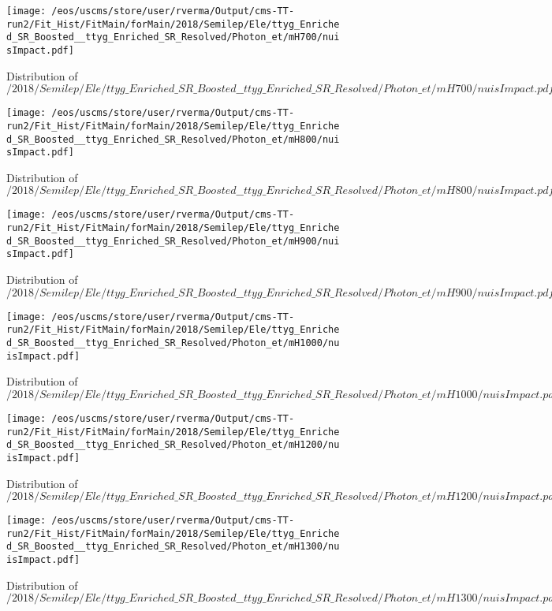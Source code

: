 \begin{figure}
\centering
\texttt{[image: /eos/uscms/store/user/rverma/Output/cms-TT-run2/Fit\_Hist/FitMain/forMain/2018/Semilep/Ele/ttyg\_Enriched\_SR\_Boosted\_\_ttyg\_Enriched\_SR\_Resolved/Photon\_et/mH700/nuisImpact.pdf]}
\caption{Distribution of $/2018/Semilep/Ele/ttyg\_Enriched\_SR\_Boosted\_\_ttyg\_Enriched\_SR\_Resolved/Photon\_et/mH700/nuisImpact.pdf$}
\end{figure}

\begin{figure}
\centering
\texttt{[image: /eos/uscms/store/user/rverma/Output/cms-TT-run2/Fit\_Hist/FitMain/forMain/2018/Semilep/Ele/ttyg\_Enriched\_SR\_Boosted\_\_ttyg\_Enriched\_SR\_Resolved/Photon\_et/mH800/nuisImpact.pdf]}
\caption{Distribution of $/2018/Semilep/Ele/ttyg\_Enriched\_SR\_Boosted\_\_ttyg\_Enriched\_SR\_Resolved/Photon\_et/mH800/nuisImpact.pdf$}
\end{figure}

\begin{figure}
\centering
\texttt{[image: /eos/uscms/store/user/rverma/Output/cms-TT-run2/Fit\_Hist/FitMain/forMain/2018/Semilep/Ele/ttyg\_Enriched\_SR\_Boosted\_\_ttyg\_Enriched\_SR\_Resolved/Photon\_et/mH900/nuisImpact.pdf]}
\caption{Distribution of $/2018/Semilep/Ele/ttyg\_Enriched\_SR\_Boosted\_\_ttyg\_Enriched\_SR\_Resolved/Photon\_et/mH900/nuisImpact.pdf$}
\end{figure}

\begin{figure}
\centering
\texttt{[image: /eos/uscms/store/user/rverma/Output/cms-TT-run2/Fit\_Hist/FitMain/forMain/2018/Semilep/Ele/ttyg\_Enriched\_SR\_Boosted\_\_ttyg\_Enriched\_SR\_Resolved/Photon\_et/mH1000/nuisImpact.pdf]}
\caption{Distribution of $/2018/Semilep/Ele/ttyg\_Enriched\_SR\_Boosted\_\_ttyg\_Enriched\_SR\_Resolved/Photon\_et/mH1000/nuisImpact.pdf$}
\end{figure}

\begin{figure}
\centering
\texttt{[image: /eos/uscms/store/user/rverma/Output/cms-TT-run2/Fit\_Hist/FitMain/forMain/2018/Semilep/Ele/ttyg\_Enriched\_SR\_Boosted\_\_ttyg\_Enriched\_SR\_Resolved/Photon\_et/mH1200/nuisImpact.pdf]}
\caption{Distribution of $/2018/Semilep/Ele/ttyg\_Enriched\_SR\_Boosted\_\_ttyg\_Enriched\_SR\_Resolved/Photon\_et/mH1200/nuisImpact.pdf$}
\end{figure}

\begin{figure}
\centering
\texttt{[image: /eos/uscms/store/user/rverma/Output/cms-TT-run2/Fit\_Hist/FitMain/forMain/2018/Semilep/Ele/ttyg\_Enriched\_SR\_Boosted\_\_ttyg\_Enriched\_SR\_Resolved/Photon\_et/mH1300/nuisImpact.pdf]}
\caption{Distribution of $/2018/Semilep/Ele/ttyg\_Enriched\_SR\_Boosted\_\_ttyg\_Enriched\_SR\_Resolved/Photon\_et/mH1300/nuisImpact.pdf$}
\end{figure}

